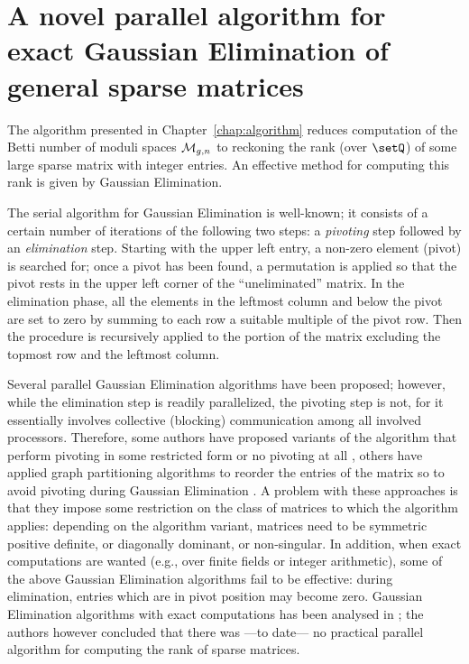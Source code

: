 
\chapter[Parallel Gaussian Elimination]
  {A novel parallel algorithm for exact Gaussian Elimination 
    of general sparse matrices}
\label{chap:rheinfall}

The algorithm presented in Chapter~\ref{chap:algorithm} reduces
computation of the Betti number of moduli spaces $\mathcal{M}_{g,n}$ to
reckoning the rank (over $\setQ$) of some large sparse matrix with
integer entries.  An effective method for computing this rank is given
by Gaussian Elimination.

The serial algorithm for Gaussian Elimination is well-known; it
consists of a certain number of iterations of the following two steps: a
\emph{pivoting} step followed by an \emph{elimination} step.  Starting
with the upper left entry, a non-zero element (pivot) is searched for;
once a pivot has been found, a permutation is applied so that the
pivot rests in the upper left corner of the ``uneliminated'' matrix.
In the elimination phase, all the elements in the leftmost column and
below the pivot are set to zero by summing to each row a suitable
multiple of the pivot row.  Then the procedure is recursively applied
to the portion of the matrix excluding the topmost row and the
leftmost column.

Several parallel Gaussian Elimination algorithms have been proposed;
however, while the elimination step is readily parallelized, the
pivoting step is not, for it essentially involves collective
(blocking) communication among all involved processors.  Therefore,
some authors have proposed variants of the algorithm that perform
pivoting in some restricted form or no pivoting at all \cite{Tiskin99,
  DBLP:journals/corr/abs-0912-2047}, others have applied graph
partitioning algorithms to reorder the entries of the matrix so to
avoid pivoting during Gaussian Elimination \cite{grigoridemmelli07}.
A problem with these approaches is that they impose some restriction
on the class of matrices to which the algorithm applies: depending on
the algorithm variant, matrices need to be symmetric positive
definite, or diagonally dominant, or non-singular.  In addition, when
exact computations are wanted (e.g., over finite fields or integer
arithmetic), some of the above Gaussian Elimination algorithms fail to
be effective: during elimination, entries which are in pivot position
may become zero.  Gaussian Elimination algorithms with exact
computations has been analysed in \cite{Dumas02computingthe}; the
authors however concluded that there was ---to date--- no practical
parallel algorithm for computing the rank of sparse matrices.

